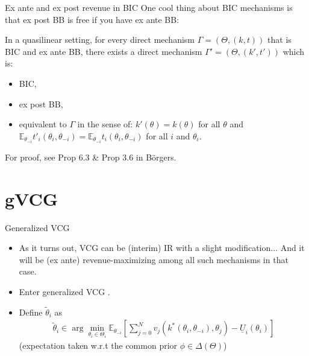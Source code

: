 \documentclass[english,10pt
,aspectratio=169
]{beamer}
\begin{document}
\begin{frame}{Ex ante and ex post revenue in BIC}
	One cool thing about BIC mechanisms is that ex post BB is free if you have ex ante BB:
	\begin{theorem}
		In a \alert{quasilinear} setting, for every direct mechanism $\Gamma = (\Theta, (k,t))$ that is BIC and \alert{ex ante BB}, there exists a direct mechanism $\Gamma' = (\Theta, (k',t'))$ which is:
		\begin{itemize}
			\item BIC,
			\item \alert{ex post BB},
			\item equivalent to $\Gamma$ in the sense of: $k'(\theta) = k(\theta)$ for all $\theta$ and $\mathbb{E}_{\theta_{-i}} t'_i(\theta_i,\theta_{-i}) = \mathbb{E}_{\theta_{-i}} t_i(\theta_i,\theta_{-i})$ for all $i$ and $\theta_i$.
		\end{itemize}
	\end{theorem}
	For proof, see Prop 6.3 \& Prop 3.6 in B{\"o}rgers.
\end{frame}


\section{gVCG}

\begin{frame}{Generalized VCG}
	\begin{itemize}
		\item As it turns out, VCG can be (interim) IR with a slight modification... And it will be (ex ante) revenue-maximizing among all such mechanisms in that case.
		\item Enter \alert{generalized VCG} \citep{krishna_efficient_2000}.
		\pause\medskip
		\item Define  $\tilde{\theta}_i$ as
		\begin{align*}
		\tilde{\theta}_i \in \arg \min_{\theta_i \in \Theta_i} \mathbb{E}_{\theta_{-i}} \left[ \sum_{j=0}^{N} v_j (k^*(\theta_i,\theta_{-i}),\theta_j) - \underline{U}_i (\theta_i) \right]
		\end{align*}
		(expectation taken w.r.t the common prior $\phi \in \varDelta(\Theta)$)
	\end{itemize}
\end{frame}
\end{document}
